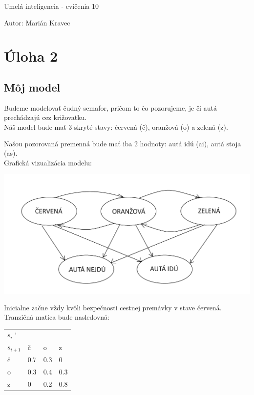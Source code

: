 \documentclass[a4paper]{article}
\begin{document}
 
	
\pagestyle{plain}

\begin{center}
	\sc\large
	Umelá inteligencia - cvičenia 10
\end{center}

Autor: Marián Kravec

\section{Úloha 2}

\subsection*{Môj model}

Budeme modelovať čudný semafor, pričom to čo pozorujeme, je či autá prechádzajú cez križovatku.
\\

Náš model bude mať 3 skryté stavy: červená (č), oranžová (o) a zelená (z).

Našou pozorovaná premenná bude mať iba 2 hodnoty: autá idú (ai), autá stoja (as).
\\

Grafická vizualizácia modelu:

\includegraphics[width=\textwidth]{HMM.png}

Inicialne začne vždy kvôli bezpečnosti cestnej premávky v stave červená.
\\ 

Tranzičná matica bude nasledovná:

\begin{table}[h!]
	\begin{tabular}{|l|l|l|l|}
		\hline
		$s_i$ \char`\\ $s_{i+1}$ & č   & o   & z   \\ \hline
		č                    & 0.7 & 0.3 & 0   \\ \hline
		o                    & 0.3 & 0.4 & 0.3 \\ \hline
		z                    & 0   & 0.2 & 0.8 \\ \hline
	\end{tabular}
\end{table}
\end{document}
